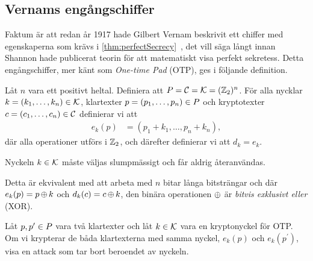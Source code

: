 \subsection{Vernams engångschiffer}
\label{sec:OTP}
Faktum är att redan år 1917 hade Gilbert Vernam beskrivit ett chiffer med 
egenskaperna som krävs i \cref{thm:perfectSecrecy}~\cite{Stinson2006cta}, 
det vill säga långt innan Shannon hade publicerat teorin för att matematiskt 
visa perfekt sekretess.
Detta engångschiffer, mer känt som \emph{One-time Pad} (OTP), ges i följande 
definition.
\begin{definition}
  Låt \(n\) vara ett positivt heltal.
  Definiera att \(\P = \C = \K = (\Z_2)^n\).
  För alla nycklar \(k = (k_1,\ldots,k_n)\in \operatorname{\mathcal{K}}\), klartexter \(p = (p_1, 
  \ldots, p_n)\in \P\) och kryptotexter \(c = (c_1,\ldots,c_n)\in \operatorname{\mathcal{C}}\) 
  definierar vi att
  \begin{align}
    \nonumber
    e_k(p) &= (p_1 + k_1, \ldots, p_n + k_n),
  \end{align}
  där alla operationer utförs i \(\mathbb{Z}_2\), och därefter definierar vi att \(d_k 
  = e_k\).

  Nyckeln \(k\in \operatorname{\mathcal{K}}\) måste väljas slumpmässigt och får aldrig återanvändas.
\end{definition}

Detta är ekvivalent med att arbeta med \(n\) bitar långa bitsträngar och där 
\(e_k(p) = p\operatorname{\oplus} k\) och \(d_k(c) = c\operatorname{\oplus} k\), den binära operationen \(\operatorname{\oplus}\) 
är \emph{bitvis exklusivt eller} (XOR).

\begin{exercise}
  Låt \(p, p^\prime\in \P\) vara två klartexter och låt \(k\in \operatorname{\mathcal{K}}\) vara en 
  kryptonyckel för OTP.\@
  Om vi krypterar de båda klartexterna med samma nyckel, \(e_k(p)\) och 
  \(e_k(p^\prime)\), visa en attack som tar bort beroendet av nyckeln.
\end{exercise}

